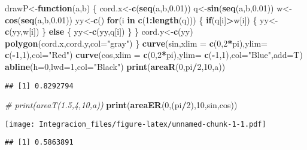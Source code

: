 \documentclass[]{article}
\newenvironment{Shaded}{\begin{snugshade}}{\end{snugshade}}
\newcommand{\KeywordTok}[1]{\textcolor[rgb]{0.13,0.29,0.53}{\textbf{#1}}}
\newcommand{\DataTypeTok}[1]{\textcolor[rgb]{0.13,0.29,0.53}{#1}}
\newcommand{\DecValTok}[1]{\textcolor[rgb]{0.00,0.00,0.81}{#1}}
\newcommand{\FloatTok}[1]{\textcolor[rgb]{0.00,0.00,0.81}{#1}}
\newcommand{\StringTok}[1]{\textcolor[rgb]{0.31,0.60,0.02}{#1}}
\newcommand{\CommentTok}[1]{\textcolor[rgb]{0.56,0.35,0.01}{\textit{#1}}}
\newcommand{\ControlFlowTok}[1]{\textcolor[rgb]{0.13,0.29,0.53}{\textbf{#1}}}
\newcommand{\OperatorTok}[1]{\textcolor[rgb]{0.81,0.36,0.00}{\textbf{#1}}}
\newcommand{\NormalTok}[1]{#1}
\begin{document}
\begin{Shaded}
\begin{Highlighting}[]
\NormalTok{drawP<-}\ControlFlowTok{function}\NormalTok{(a,b)}
\NormalTok{\{}
\NormalTok{  cord.x<-}\KeywordTok{c}\NormalTok{(}\KeywordTok{seq}\NormalTok{(a,b,}\FloatTok{0.01}\NormalTok{))}
\NormalTok{  q<-}\KeywordTok{sin}\NormalTok{(}\KeywordTok{seq}\NormalTok{(a,b,}\FloatTok{0.01}\NormalTok{))}
\NormalTok{  w<-}\KeywordTok{cos}\NormalTok{(}\KeywordTok{seq}\NormalTok{(a,b,}\FloatTok{0.01}\NormalTok{))}
\NormalTok{  yy<-}\KeywordTok{c}\NormalTok{()}
  \ControlFlowTok{for}\NormalTok{(i }\ControlFlowTok{in} \KeywordTok{c}\NormalTok{(}\DecValTok{1}\OperatorTok{:}\KeywordTok{length}\NormalTok{(q)))}
\NormalTok{  \{}
    \ControlFlowTok{if}\NormalTok{(q[i]}\OperatorTok{>}\NormalTok{w[i])}
\NormalTok{    \{}
\NormalTok{      yy<-}\KeywordTok{c}\NormalTok{(yy,w[i])}
\NormalTok{    \}}
    \ControlFlowTok{else}
\NormalTok{    \{}
\NormalTok{      yy<-}\KeywordTok{c}\NormalTok{(yy,q[i])}
\NormalTok{    \}}
\NormalTok{  \}}
\NormalTok{  cord.y<-}\KeywordTok{c}\NormalTok{(yy)}
  \KeywordTok{polygon}\NormalTok{(cord.x,cord.y,}\DataTypeTok{col=}\StringTok{"gray"}\NormalTok{)}
\NormalTok{\}}
\KeywordTok{curve}\NormalTok{(sin,}\DataTypeTok{xlim =} \KeywordTok{c}\NormalTok{(}\DecValTok{0}\NormalTok{,}\DecValTok{2}\OperatorTok{*}\NormalTok{pi),}\DataTypeTok{ylim=} \KeywordTok{c}\NormalTok{(}\OperatorTok{-}\DecValTok{1}\NormalTok{,}\DecValTok{1}\NormalTok{),}\DataTypeTok{col=}\StringTok{"Red"}\NormalTok{)}
\KeywordTok{curve}\NormalTok{(cos,}\DataTypeTok{xlim =} \KeywordTok{c}\NormalTok{(}\DecValTok{0}\NormalTok{,}\DecValTok{2}\OperatorTok{*}\NormalTok{pi),}\DataTypeTok{ylim=} \KeywordTok{c}\NormalTok{(}\OperatorTok{-}\DecValTok{1}\NormalTok{,}\DecValTok{1}\NormalTok{),}\DataTypeTok{col=}\StringTok{"Blue"}\NormalTok{,}\DataTypeTok{add=}\NormalTok{T)}
\KeywordTok{abline}\NormalTok{(}\DataTypeTok{h=}\DecValTok{0}\NormalTok{,}\DataTypeTok{lwd=}\DecValTok{1}\NormalTok{,}\DataTypeTok{col=}\StringTok{"Black"}\NormalTok{)}
\KeywordTok{print}\NormalTok{(}\KeywordTok{areaR}\NormalTok{(}\DecValTok{0}\NormalTok{,pi}\OperatorTok{/}\DecValTok{2}\NormalTok{,}\DecValTok{10}\NormalTok{,a))}
\end{Highlighting}
\end{Shaded}

\begin{verbatim}
## [1] 0.8292794
\end{verbatim}

\begin{Shaded}
\begin{Highlighting}[]
\CommentTok{# print(areaT(1.5,4,10,a))}
\KeywordTok{print}\NormalTok{(}\KeywordTok{areaER}\NormalTok{(}\DecValTok{0}\NormalTok{,(pi}\OperatorTok{/}\DecValTok{2}\NormalTok{),}\DecValTok{10}\NormalTok{,sin,cos))}
\end{Highlighting}
\end{Shaded}

\texttt{[image: Integracion\_files/figure-latex/unnamed-chunk-1-1.pdf]}

\begin{verbatim}
## [1] 0.5863891
\end{verbatim}
\end{document}

